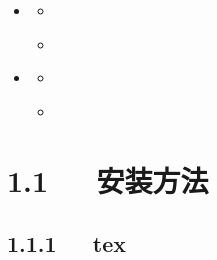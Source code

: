 \documentclass[letterpaper,12pt,english]{sphinxmanual}
\begin{document}
\begin{sphinxShadowBox}
\begin{itemize}
\begin{itemize}
\begin{itemize}
\begin{itemize}
\end{itemize}

\end{itemize}

\item {} 
\label{\detokenize{001software/001install/LaTex:id24}}{\hyperref[\detokenize{001software/001install/LaTex:latexhelp}]{}}
\begin{itemize}
\item {} 
\label{\detokenize{001software/001install/LaTex:id25}}{\hyperref[\detokenize{001software/001install/LaTex:xelatex-help}]{}}

\item {} 
\label{\detokenize{001software/001install/LaTex:id26}}{\hyperref[\detokenize{001software/001install/LaTex:misc}]{}}

\end{itemize}

\item {} 
\label{\detokenize{001software/001install/LaTex:id27}}{\hyperref[\detokenize{001software/001install/LaTex:faq}]{}}
\begin{itemize}
\item {} 
\label{\detokenize{001software/001install/LaTex:id28}}{\hyperref[\detokenize{001software/001install/LaTex:pdflatexxelatex}]{}}

\item {} 
\label{\detokenize{001software/001install/LaTex:id29}}{\hyperref[\detokenize{001software/001install/LaTex:latex-tex}]{}}

\end{itemize}

\end{itemize}

\end{itemize}
\end{sphinxShadowBox}


\section{1.1   安装方法}
\label{\detokenize{001software/001install/LaTex:id2}}

\subsection{1.1.1   tex}
\label{\detokenize{001software/001install/LaTex:tex}}
\end{document}
